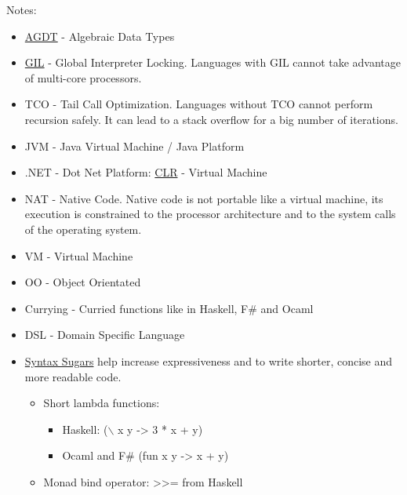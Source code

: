 \documentclass[11pt]{article}
\begin{document}
Notes:

\begin{itemize}
\item \href{https://en.wikipedia.org/wiki/Algebraic_data_type}{AGDT}  - Algebraic Data Types

\item \href{https://en.wikipedia.org/wiki/Global_interpreter_lock}{GIL} - Global Interpreter Locking. Languages with GIL cannot take
advantage of multi-core processors.

\item TCO - Tail Call Optimization. Languages without TCO cannot perform
recursion safely. It can lead to a stack overflow for a big number
of iterations.

\item JVM    - Java Virtual Machine / Java Platform

\item .NET  - Dot Net Platform: \href{https://en.wikipedia.org/wiki/Common_Language_Runtime}{CLR} - Virtual Machine

\item NAT    - Native Code. Native code is not portable like a virtual
machine, its execution is constrained to the processor architecture
and to the system calls of the operating system.

\item VM     - Virtual Machine

\item OO     - Object Orientated

\item Currying  - Curried functions like in Haskell, F\# and Ocaml

\item DSL    - Domain Specific Language

\item \uline{Syntax Sugars} help increase expressiveness and to write shorter,
concise and more readable code. 

\begin{itemize}
\item Short lambda functions:
\begin{itemize}
\item Haskell:      ($\backslash$ x y -> 3 * x + y)
\item Ocaml and F\#  (fun x y -> x + y)
\end{itemize}

\item Monad bind operator: >>= from Haskell


\end{itemize}
\end{itemize}
\end{document}
